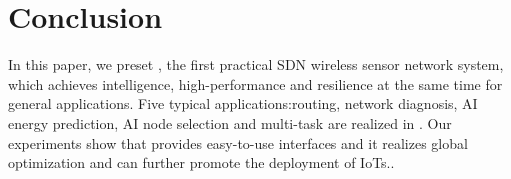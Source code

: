 \section{Conclusion}
\label{Con}

In this paper, we preset {\sdn}, the first practical SDN 
wireless sensor network system,
which achieves intelligence, high-performance and 
resilience at the same time for general applications. 
Five typical applications:routing, network diagnosis, AI energy prediction, 
AI node selection and multi-task are realized in {\sdn}.
%
Our experiments show that {\sdn} 
%
{\sdn} provides easy-to-use interfaces 
and it realizes global optimization and 
can further promote the deployment of IoTs..

